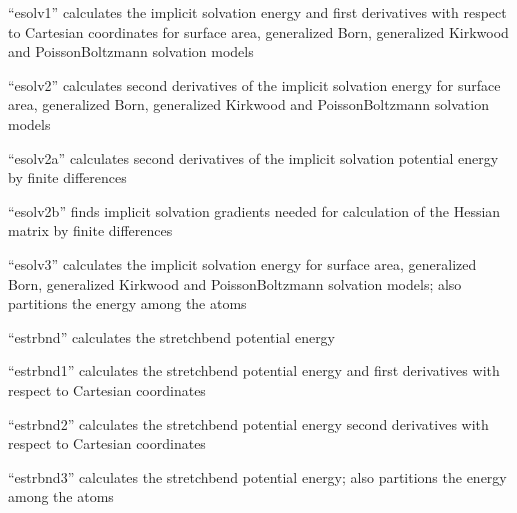 \documentclass[letterpaper,11pt,english]{sphinxmanual}
\begin{document}
\sphinxAtStartPar
{}

\sphinxAtStartPar
“esolv1” calculates the implicit solvation energy and first derivatives with respect to Cartesian coordinates for surface area, generalized Born, generalized Kirkwood and Poisson\sphinxhyphen{}Boltzmann solvation models

\sphinxAtStartPar
{}

\sphinxAtStartPar
“esolv2” calculates second derivatives of the implicit solvation energy for surface area, generalized Born, generalized Kirkwood and Poisson\sphinxhyphen{}Boltzmann solvation models

\sphinxAtStartPar
{}

\sphinxAtStartPar
“esolv2a” calculates second derivatives of the implicit solvation potential energy by finite differences

\sphinxAtStartPar
{}

\sphinxAtStartPar
“esolv2b” finds implicit solvation gradients needed for calculation of the Hessian matrix by finite differences

\sphinxAtStartPar
{}

\sphinxAtStartPar
“esolv3” calculates the implicit solvation energy for surface area, generalized Born, generalized Kirkwood and Poisson\sphinxhyphen{}Boltzmann solvation models; also partitions the energy among the atoms

\sphinxAtStartPar
{}

\sphinxAtStartPar
“estrbnd” calculates the stretch\sphinxhyphen{}bend potential energy

\sphinxAtStartPar
{}

\sphinxAtStartPar
“estrbnd1” calculates the stretch\sphinxhyphen{}bend potential energy and first derivatives with respect to Cartesian coordinates

\sphinxAtStartPar
{}

\sphinxAtStartPar
“estrbnd2” calculates the stretch\sphinxhyphen{}bend potential energy second derivatives with respect to Cartesian coordinates

\sphinxAtStartPar
{}

\sphinxAtStartPar
“estrbnd3” calculates the stretch\sphinxhyphen{}bend potential energy; also partitions the energy among the atoms
\end{document}
